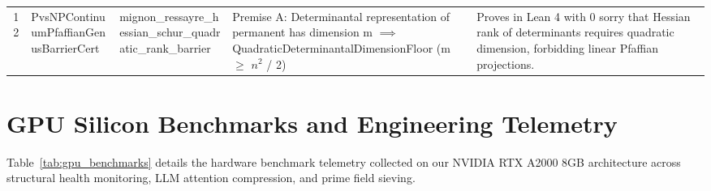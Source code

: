 \documentclass[11pt,a4paper]{article}
\begin{document}
\begin{longtable}{cp{2.8cm}>{\raggedright\arraybackslash}p{4.0cm}>{\raggedright\arraybackslash}p{4.0cm}>{\raggedright\arraybackslash}p{4.5cm}}
12 & {\scriptsize\ttfamily Pvs\allowbreak NPContinuum\allowbreak Pfaffian\allowbreak Genus\allowbreak Barrier\allowbreak Cert} & {\scriptsize\ttfamily mignon\_\allowbreak ressayre\_\allowbreak hessian\_\allowbreak schur\_\allowbreak quadratic\_\allowbreak rank\_\allowbreak barrier} & {\scriptsize Premise A: Determinantal representation of permanent has dimension m $\implies$ QuadraticDeterminantalDimensionFloor (m $\ge$ $n^{2}$ / 2)} & Proves in Lean 4 with 0 sorry that Hessian rank of determinants requires quadratic dimension, forbidding linear Pfaffian projections. \\
\end{longtable}

\clearpage
\section{GPU Silicon Benchmarks and Engineering Telemetry}

Table~\ref{tab:gpu_benchmarks} details the hardware benchmark telemetry collected on our NVIDIA RTX A2000 8GB architecture across structural health monitoring, LLM attention compression, and prime field sieving.
\end{document}
